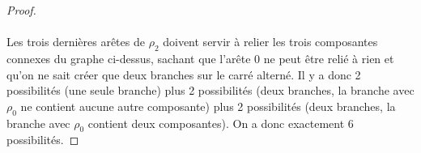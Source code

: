 \begin{proof}
\begin{figure}[H]
\begin{center}
      \caption{}
    \end{center}
  \end{figure}

  \paragraph{}
  Les trois dernières arêtes de $\rho_2$ doivent servir à relier les trois composantes connexes du graphe ci-dessus, sachant que l'arête 0 ne peut être relié à rien et qu'on ne sait créer que deux branches sur le carré alterné. Il y a donc 2 possibilités (une seule branche) plus 2 possibilités (deux branches, la branche avec $\rho_0$ ne contient aucune autre composante) plus 2 possibilités (deux branches, la branche avec $\rho_0$ contient deux composantes). On a donc exactement 6 possibilités.

\end{proof}

